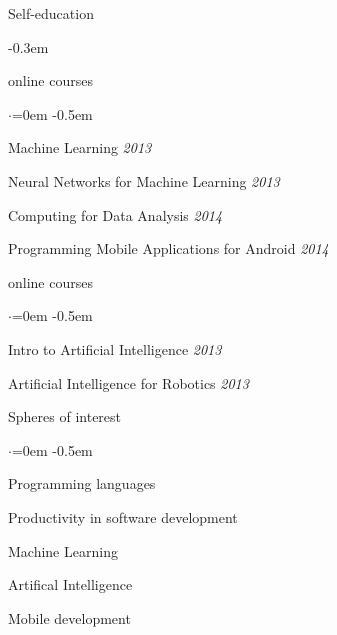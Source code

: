 \documentclass{resume} %
\begin{document}
\begin{rSection}{Self-education}

\begin{description} \itemsep -0.3em
  \item[Coursera] \hfill {online courses}
  \begin{list}{$\cdot$}{\leftmargin=0em} %
    \itemsep -0.5em \vspace{-0.5em} %
    \item Machine Learning \hfill {\em 2013}
    \item Neural Networks for Machine Learning \hfill {\em  2013}
    \item Computing for Data Analysis \hfill {\em  2014}
    \item Programming Mobile Applications for Android \hfill {\em  2014}
  \end{list}
  \item[Udacity] \hfill {online courses}
  \begin{list}{$\cdot$}{\leftmargin=0em} %
    \itemsep -0.5em \vspace{-0.5em} %
    \item Intro to Artificial Intelligence \hfill {\em  2013}
    \item Artificial Intelligence for Robotics \hfill {\em  2013}
  \end{list}
\end{description}

\end{rSection}


\begin{rSection}{Spheres of interest}
  \smallskip
  \begin{list}{$\cdot$}{\leftmargin=0em} %
    \itemsep -0.5em \vspace{-0.5em} %
  \item Programming languages
  \item Productivity in software development
  \item Machine Learning
  \item Artifical Intelligence
  \item Mobile development
  \end{list}
\end{rSection}
\end{document}
